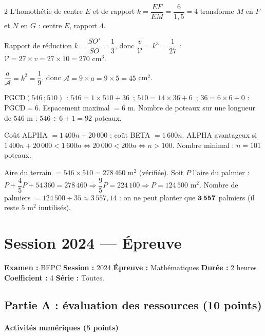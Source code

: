 \begin{multicols}{2}
L'homothétie de centre $E$ et de rapport $k=\dfrac{EF}{EM}=\dfrac6{1{,}5}=4$ transforme $M$
en $F$ et $N$ en $G$ : centre $E$, rapport $4$.

Rapport de réduction $k=\dfrac{SO'}{SO}=\dfrac13$, donc $\dfrac{v}{\mathcal V}=k^{3}=\dfrac1{27}$ :
$\mathcal V=27\times v=27\times10=270$ cm$^{3}$.

$\dfrac{a}{\mathcal A}=k^{2}=\dfrac19$, donc $\mathcal A=9\times a=9\times5=45$ cm$^{2}$.

$\text{PGCD}(546\,;510)$ : $546=1\times510+36$~; $510=14\times36+6$~; $36=6\times6+0$ :
$\text{PGCD}=6$. Espacement maximal $=6$ m. Nombre de poteaux sur une longueur de $546$ m :
$546\div6+1=92$ poteaux.

Coût ALPHA $=1\,400n+20\,000$ ; coût BETA $=1\,600n$. ALPHA avantageux si
$1\,400n+20\,000<1\,600n\Leftrightarrow20\,000<200n\Leftrightarrow n>100$. Nombre minimal :
$n=101$ poteaux.

Aire du terrain $=546\times510=278\,460$ m$^{2}$ (vérifiée). Soit $P$ l'aire du palmier :
$P+\dfrac45P+54\,360=278\,460\Rightarrow\dfrac95P=224\,100\Rightarrow P=124\,500$ m$^{2}$.
Nombre de palmiers $=124\,500\div35\approx3\,557{,}14$ : on ne peut planter que
$\textbf{3\,557}$ palmiers (il reste $5$ m$^{2}$ inutilisés).

\end{multicols}

\section{Session 2024 — Épreuve}

\noindent\textbf{Examen :} BEPC \quad\textbf{Session :} 2024 \quad\textbf{Épreuve :}
Mathématiques \quad\textbf{Durée :} 2 heures \quad\textbf{Coefficient :} 4 \quad
\textbf{Série :} Toutes.

\subsection*{Partie A : évaluation des ressources (10 points)}

\paragraph{Activités numériques (5 points)}

